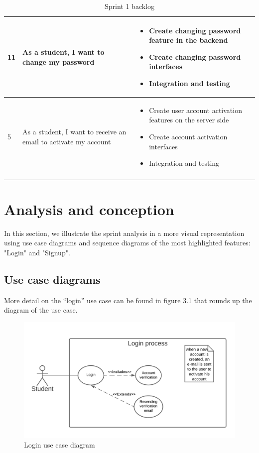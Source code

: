 \begin{longtable}{|l|p{6cm}|p{8cm}|}
11 & As a student, I want to change my password & \begin{itemize}
    \item Create changing password feature in the backend
    \item Create changing password interfaces
    \item Integration and testing
\end{itemize} \\ \hline

5 & As a student, I want to receive an email to activate my account & \begin{itemize}
    \item Create user account activation features on the server side
    \item Create account activation interfaces
    \item Integration and testing
\end{itemize} \\ \hline
\caption{Sprint 1 backlog}
\label{Tab: Sprint 1 backlog}
\end{longtable}


\section{ Analysis and conception}
In this section, we illustrate the sprint analysis in a more visual representation using use case diagrams and sequence diagrams of the most highlighted features:
"Login" and "Signup".

\subsection{Use case diagrams}
More detail on the “login” use case can be found in figure 3.1 that rounds up the diagram of the use case.

\begin{figure}[H] 
            \centering
            \includegraphics[scale=0.9]{diagrams/refined use case login.png}
            \caption{Login use case diagram} 
            \label{fig: Login use case diagram}
\end{figure}


